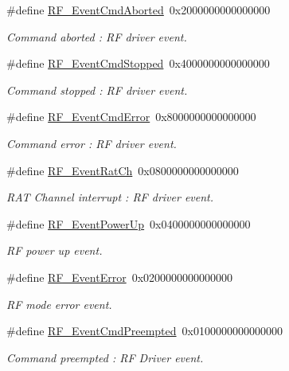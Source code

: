 \begin{DoxyCompactItemize}
\#define \hyperlink{group___r_f___driver___events_ga95a0bf832c19fbdce2c164144ad265ee}{R\+F\+\_\+\+Event\+Cmd\+Aborted}~0x2000000000000000
\begin{DoxyCompactList}\small\item\em Command aborted \+: R\+F driver event. \end{DoxyCompactList}\item 
\#define \hyperlink{group___r_f___driver___events_gac68cfb0f9c26d275ad990f5da9e6b91f}{R\+F\+\_\+\+Event\+Cmd\+Stopped}~0x4000000000000000
\begin{DoxyCompactList}\small\item\em Command stopped \+: R\+F driver event. \end{DoxyCompactList}\item 
\#define \hyperlink{group___r_f___driver___events_ga8255e5773828977cb205fd1f856e710e}{R\+F\+\_\+\+Event\+Cmd\+Error}~0x8000000000000000
\begin{DoxyCompactList}\small\item\em Command error \+: R\+F driver event. \end{DoxyCompactList}\item 
\#define \hyperlink{group___r_f___driver___events_gab0302093e17c587cc4bf2c928c79960e}{R\+F\+\_\+\+Event\+Rat\+Ch}~0x0800000000000000
\begin{DoxyCompactList}\small\item\em R\+A\+T Channel interrupt \+: R\+F driver event. \end{DoxyCompactList}\item 
\#define \hyperlink{group___r_f___driver___events_ga0e6d5e7d3760a65ba37d8f26823e9a0a}{R\+F\+\_\+\+Event\+Power\+Up}~0x0400000000000000
\begin{DoxyCompactList}\small\item\em R\+F power up event. \end{DoxyCompactList}\item 
\#define \hyperlink{group___r_f___driver___events_gaa6b858b8b383210049fa3f17dcd95fac}{R\+F\+\_\+\+Event\+Error}~0x0200000000000000
\begin{DoxyCompactList}\small\item\em R\+F mode error event. \end{DoxyCompactList}\item 
\#define \hyperlink{group___r_f___driver___events_ga267ffc8a08c3ce6ffa82b704dba641be}{R\+F\+\_\+\+Event\+Cmd\+Preempted}~0x0100000000000000
\begin{DoxyCompactList}\small\item\em Command preempted \+: R\+F Driver event. \end{DoxyCompactList}\item 

\end{DoxyCompactItemize}
